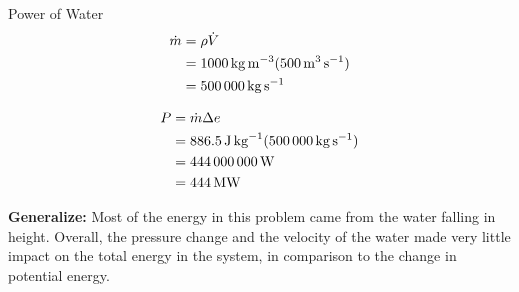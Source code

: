 \begin{example}{Power of Water}
  \begin{align*}
    \dot{m} &= \rho \dot{V} \\
                     &= \SI{1000}{\kilo\gram\per\meter\cubed} (\SI{500}{\meter\cubed\per\second}) \\
                     &= \SI{500000}{\kilo\gram\per\second}
  \end{align*}

  \begin{align*}
    P &= \dot{m} \Delta e \\
           &= \SI{886.5}{\joule\per\kilogram} (\SI{500000}{\kilo\gram\per\second}) \\
           &= \SI{444000000}{\watt} \\
           &= \SI{444}{\mega\watt}
  \end{align*}

  \textbf{Generalize:}
  Most of the energy in this problem came from the water falling in height.
  Overall, the pressure change and the velocity of the water made very little impact on the total energy in the system, in comparison to the change in potential energy.
\end{example}

